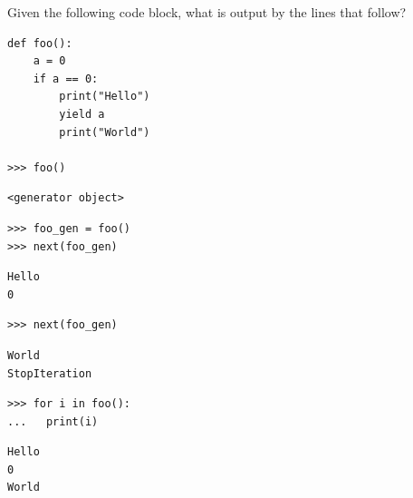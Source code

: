\begin{blocksection}
\question Given the following code block, what is output by the lines that follow?

\begin{lstlisting}
def foo():
    a = 0
    if a == 0:
        print("Hello")
        yield a
        print("World")

>>> foo()
\end{lstlisting}
\begin{solution}[0.25in]
\begin{lstlisting}
<generator object>
\end{lstlisting}
\end{solution}
\end{blocksection}

\begin{blocksection}
\begin{lstlisting}
>>> foo_gen = foo()
>>> next(foo_gen)
\end{lstlisting}

\begin{solution}[0.5in]
\begin{lstlisting}
Hello
0
\end{lstlisting}
\end{solution}
\end{blocksection}

\begin{blocksection}
\begin{lstlisting}
>>> next(foo_gen)
\end{lstlisting}

\begin{solution}[0.5in]
\begin{lstlisting}
World
StopIteration
\end{lstlisting}
\end{solution}
\end{blocksection}

\begin{blocksection}
\begin{lstlisting}
>>> for i in foo():
...   print(i)
\end{lstlisting}

\begin{solution}[0.5in]
\begin{lstlisting}
Hello
0
World
\end{lstlisting}
\end{solution}
\end{blocksection}


